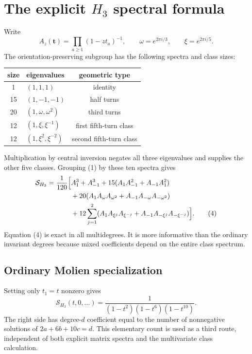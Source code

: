 \documentclass[11pt]{article}
\newcommand{\Sfun}{\mathcal S}
\begin{document}
\section{The explicit $H_3$ spectral formula}

Write
\[
A_z(\mathbf t)=\prod_{a\geq1}(1-zt_a)^{-1},\qquad
\omega=e^{2\pi i/3},\qquad \xi=e^{2\pi i/5}.
\]
The orientation-preserving subgroup has the following spectra and class sizes:
\begin{center}
\begin{tabular}{@{}clc@{}}
\toprule
size & eigenvalues & geometric type\\
\midrule
1  & $(1,1,1)$ & identity\\
15 & $(1,-1,-1)$ & half turns\\
20 & $(1,\omega,\omega^2)$ & third turns\\
12 & $(1,\xi,\xi^{-1})$ & first fifth-turn class\\
12 & $(1,\xi^2,\xi^{-2})$ & second fifth-turn class\\
\bottomrule
\end{tabular}
\end{center}
Multiplication by central inversion negates all three eigenvalues and supplies
the other five classes.  Grouping (1) by these ten spectra gives
\begin{align}
\Sfun_{H_3}=\frac1{120}\Big[&A_1^3+A_{-1}^3
+15(A_1A_{-1}^2+A_{-1}A_1^2)\notag\\
&+20(A_1A_\omega A_{\omega^2}
+A_{-1}A_{-\omega}A_{-\omega^2})\notag\\
&+12\sum_{j=1}^{2}(A_1A_{\xi^j}A_{\xi^{-j}}
+A_{-1}A_{-\xi^j}A_{-\xi^{-j}})\Big].                       \tag{4}
\end{align}
Equation (4) is exact in all multidegrees.  It is more informative than the
ordinary invariant degrees because mixed coefficients depend on the entire
class spectrum.

\subsection{Ordinary Molien specialization}

Setting only $t_1=t$ nonzero gives
\begin{equation}
\Sfun_{H_3}(t,0,\ldots)=
\frac1{(1-t^2)(1-t^6)(1-t^{10})}.                             \tag{5}
\end{equation}
The right side has degree-$d$ coefficient equal to the number of nonnegative
solutions of $2a+6b+10c=d$.  This elementary count is used as a third route,
independent of both explicit matrix spectra and the multivariate class
calculation.
\end{document}
